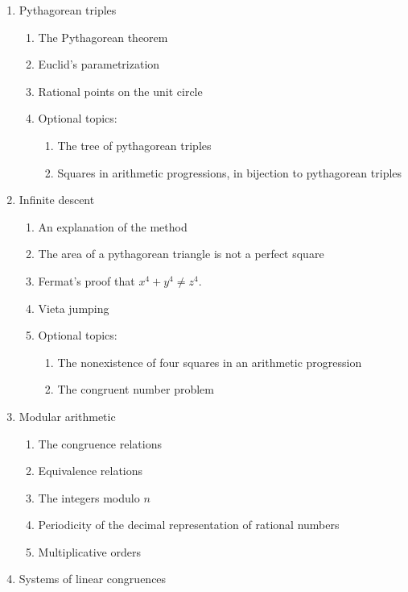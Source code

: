 \documentclass{article}
\begin{document}
\begin{enumerate}
\begin{enumerate}
  \item Irrationality of square roots
  \item Continued fractiosn
  \item Farey's series
  \end{enumerate}
\item Pythagorean triples
  \begin{enumerate}
  \item The Pythagorean theorem
  \item Euclid's parametrization
  \item Rational points on the unit circle
  \item Optional topics:
    \begin{enumerate}
    \item The tree of pythagorean triples
    \item Squares in arithmetic progressions, in bijection to pythagorean triples
    \end{enumerate}
  \end{enumerate}
\item Infinite descent
  \begin{enumerate}
  \item An explanation of the method
  \item The area of a pythagorean triangle is not a perfect square
  \item Fermat's proof that $x^4+y^4\neq z^4$.
  \item Vieta jumping
  \item Optional topics:
    \begin{enumerate}
    \item The nonexistence of four squares in an arithmetic progression
    \item The congruent number problem
    \end{enumerate}
  \end{enumerate}
\item Modular arithmetic
  \begin{enumerate}
  \item The congruence relations
  \item Equivalence relations
  \item The integers modulo $n$
  \item Periodicity of the decimal representation of rational numbers
  \item Multiplicative orders
  \end{enumerate}
\item Systems of linear congruences

\end{enumerate}
\end{document}
